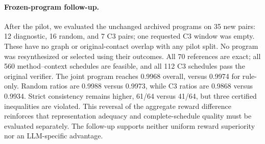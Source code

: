 \paragraph{Frozen-program follow-up.}
After the pilot, we evaluated the unchanged archived programs on 35 new
pairs: 12 diagnostic, 16 random, and 7 C3 pairs; one requested C3 window
was empty. These have no graph or original-contact overlap with any
pilot split. No program was resynthesized or selected using their outcomes.
All 70 references are exact; all 560 method--context schedules are feasible,
and all 112 C3 schedules pass the original verifier.
The joint program reaches 0.9968 overall, versus 0.9974 for rule-only.
Random ratios are 0.9988 versus 0.9973, while C3 ratios are 0.9868 versus
0.9934. Strict consistency remains higher, 61/64 versus 41/64,
but three certified inequalities are violated. This reversal of the
aggregate reward difference reinforces that representation adequacy and
complete-schedule quality must be evaluated separately. The follow-up
supports neither uniform reward superiority nor an LLM-specific advantage.
